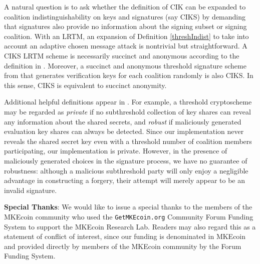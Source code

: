\documentclass{mrl}
\theoremstyle{definition}
\begin{document}
A natural question is to ask whether the definition of CIK can be expanded to coalition indistinguishability on keys and signatures (say CIKS) by demanding that signatures also provide no information about the signing subset or signing coalition.  With an LRTM, an expansion of Definition \ref{threshIndist} to take into account an adaptive chosen message attack is nontrivial but straightforward. A CIKS LRTM scheme is necessarily succinct and anonymous according to the definition in \cite{bonehthreshold}. Moreover, a succinct and anonymous threshold signature scheme from \cite{bonehthreshold} that generates verification keys for each coalition randomly is also CIKS. In this sense, CIKS is equivalent to succinct anonymity. 


Additional helpful definitions appear in \cite{bonehthreshold}. For example, a threshold cryptoscheme may be regarded as \textit{private} if no subthreshold collection of key shares can reveal any information about the shared secrets, and \textit{robust} if maliciously generated evaluation key shares can always be detected. Since our implementation never reveals the shared secret key even with a threshold number of coalition members participating, our implementation is private. However, in the presence of maliciously generated choices in the signature process, we have no guarantee of robustness: although a malicious subthreshold party will only enjoy a negligible advantage in constructing a forgery, their attempt will merely appear to be an invalid signature.

\vspace{0.1in}

\textbf{Special Thanks}: We would like to issue a special thanks to the members of the MKEcoin community who used the \texttt{GetMKEcoin.org} Community Forum Funding System to support the MKEcoin Research Lab. Readers may also regard this as a statement of conflict of interest, since our funding is denominated in MKEcoin and provided directly by members of the MKEcoin community by the Forum Funding System.

\medskip{}



\end{document}
